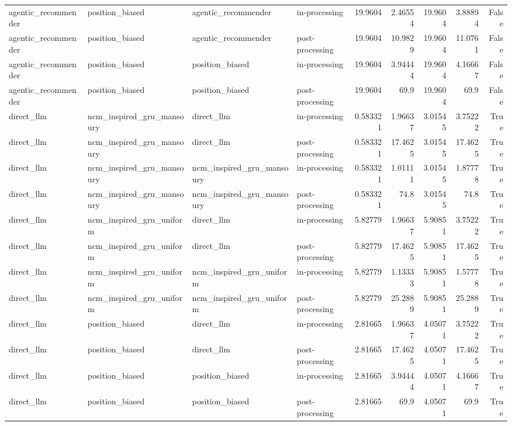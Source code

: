 \begin{table}[htbp!]
\begin{tabular}{llllrrrrr}
agentic\_recommender & position\_biased & agentic\_recommender & in-processing & 19.9604 & 2.46554 & 19.9604 & 3.88894 & False \\
agentic\_recommender & position\_biased & agentic\_recommender & post-processing & 19.9604 & 10.9829 & 19.9604 & 11.0761 & False \\
agentic\_recommender & position\_biased & position\_biased & in-processing & 19.9604 & 3.94444 & 19.9604 & 4.16667 & False \\
agentic\_recommender & position\_biased & position\_biased & post-processing & 19.9604 & 69.9 & 19.9604 & 69.9 & False \\
direct\_llm & ncm\_inspired\_gru\_mansoury & direct\_llm & in-processing & 0.583321 & 1.96637 & 3.01545 & 3.75222 & True \\
direct\_llm & ncm\_inspired\_gru\_mansoury & direct\_llm & post-processing & 0.583321 & 17.4625 & 3.01545 & 17.4625 & True \\
direct\_llm & ncm\_inspired\_gru\_mansoury & ncm\_inspired\_gru\_mansoury & in-processing & 0.583321 & 1.01111 & 3.01545 & 1.87778 & True \\
direct\_llm & ncm\_inspired\_gru\_mansoury & ncm\_inspired\_gru\_mansoury & post-processing & 0.583321 & 74.8 & 3.01545 & 74.8 & True \\
direct\_llm & ncm\_inspired\_gru\_uniform & direct\_llm & in-processing & 5.82779 & 1.96637 & 5.90851 & 3.75222 & True \\
direct\_llm & ncm\_inspired\_gru\_uniform & direct\_llm & post-processing & 5.82779 & 17.4625 & 5.90851 & 17.4625 & True \\
direct\_llm & ncm\_inspired\_gru\_uniform & ncm\_inspired\_gru\_uniform & in-processing & 5.82779 & 1.13333 & 5.90851 & 1.57778 & True \\
direct\_llm & ncm\_inspired\_gru\_uniform & ncm\_inspired\_gru\_uniform & post-processing & 5.82779 & 25.2889 & 5.90851 & 25.2889 & True \\
direct\_llm & position\_biased & direct\_llm & in-processing & 2.81665 & 1.96637 & 4.05071 & 3.75222 & True \\
direct\_llm & position\_biased & direct\_llm & post-processing & 2.81665 & 17.4625 & 4.05071 & 17.4625 & True \\
direct\_llm & position\_biased & position\_biased & in-processing & 2.81665 & 3.94444 & 4.05071 & 4.16667 & True \\
direct\_llm & position\_biased & position\_biased & post-processing & 2.81665 & 69.9 & 4.05071 & 69.9 & True \\

\end{tabular}
\end{table}
